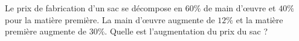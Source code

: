 
\begin{exercice}\label{exoPremiere-0016}

    Le prix de fabrication d'un sac se décompose en \( 60\%\) de main d'œuvre et \( 40\%\) pour la matière première. La main d'œuvre augmente de \( 12\%\) et la matière première augmente de \( 30\%\). Quelle est l'augmentation du prix du sac ?

\end{exercice}
